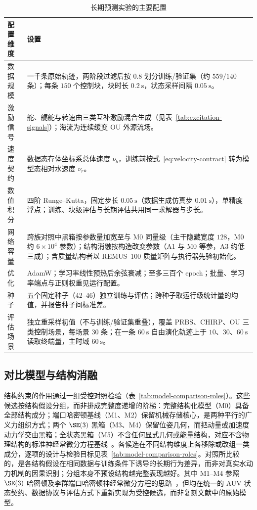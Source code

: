 \begin{table}[htbp]
  \centering
  \caption{长期预测实验的主要配置}
  \label{tab:experimental-config}
  \begin{tabularx}{\textwidth}{>{\raggedright\arraybackslash}p{}>{\raggedright\arraybackslash}X}
    \toprule
    配置维度 & 设置 \\
    \midrule
    数据规模 & 一千条原始轨迹，两阶段过滤后按 \(0.8\) 划分训练/验证集（约 \(559/140\) 条）；每条 \(150\) 个控制块，块时长 \(0.2~\mathrm{s}\)，状态采样间隔 \(0.05~\mathrm{s}\)。 \\
    激励信号 & 舵、艉舵与转速由三类互补激励混合生成（见表~\ref{tab:excitation-signals}）；海流为连续缓变 OU 外源流场。 \\
    速度契约 & 数据态存体坐标系总体速度 \(\nu_b\)，训练前按式~\eqref{eq:velocity-contract} 转为模型态相对水速度 \(\nu_r\)。 \\
    数值积分 & 四阶 Runge--Kutta，固定步长 \(0.05~\mathrm{s}\)（数据生成仿真步 \(0.01~\mathrm{s}\)），单精度浮点；训练、块级评估与长期评估共用同一求解器与步长。 \\
    网络容量 & 跨族对照中黑箱按参数量加宽至与 M0 同量级（主干隐藏宽度 \(128\)，M0 约 \(6\times10^4\) 参数）；结构消融按构造改变参数（A1 与 M0 等参，A3 约低三成）；含质量结构者以 REMUS~100 质量矩阵与执行器先验初始化。 \\
    优化 & AdamW；学习率线性预热后余弦衰减；至多三百个 epoch；批量、学习率端点与正则权重见运行配置。 \\
    种子 & 五个固定种子（42--46）独立训练与评估；跨种子取运行级统计量的均值，并报告种子间标准差。 \\
    评估场景 & 独立重采样初值（不与训练/验证集重叠），覆盖 PRBS、CHIRP、OU 三类控制场景，每场景 \(30\) 条；在一条 \(60~\mathrm{s}\) 自由演化轨迹上于 \(10\)、\(30\)、\(60~\mathrm{s}\) 读取终端量，主时域 \(60~\mathrm{s}\)。 \\
    \bottomrule
  \end{tabularx}
\end{table}

\subsection{对比模型与结构消融}
\label{subsec:models-ablations}

结构约束的作用通过一组受控对照检验（表~\ref{tab:model-comparison-roles}）。这些候选按结构假设分组，而非排成完整度递增的阶梯：完整结构化模型（M0）具备全部结构成分；端口哈密顿基线（M1、M2）保留机械存储核心，是两种平行的广义力组织方式；两个 \(\SE(3)\) 黑箱（M3、M4）保留位姿几何，而把动量或加速度动力学交由黑箱；全状态黑箱（M5）不含任何显式几何或能量结构，对应不含物理结构的标准神经常微分方程基线~\citep{chen2018neuralode}。各候选在不同结构维度上各移除或改组一类成分，逐项的设计与检验目标见表~\ref{tab:model-comparison-roles}。对照所比较的，是各结构假设在相同数据与训练条件下诱导的长期行为差异，而非对真实水动力机制的因果识别；分组本身不预设结构越完整表现越好。其中 M1--M4 参照 \(\SE(3)\) 哈密顿及李群端口哈密顿神经常微分方程的思路~\citep{duong2021se3hamnode,duong2024liegroupphnode}，但均在统一的 AUV 状态契约、数据协议与评估方式下重新实现为受控候选，而非复刻文献中的原始模型。

